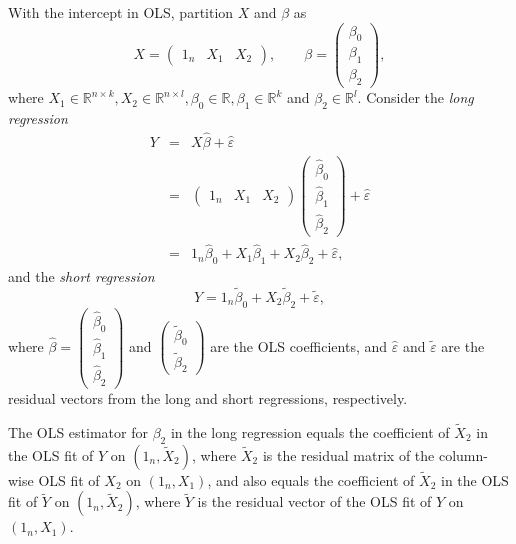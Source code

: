 With the intercept in OLS, partition $X$ and $\beta$ as 
\[
X=\left(\begin{array}{ccc}
1_n & X_{1} & X_{2}\end{array}\right),\qquad
\beta=\left(\begin{array}{c}
\beta_0 \\
\beta_{1}\\
\beta_{2}
\end{array}\right),
\]
where $X_{1}\in\mathbb{R}^{n\times k},X_{2}\in\mathbb{R}^{n\times l},  \beta_0 \in \mathbb{R},  \beta_{1}\in\mathbb{R}^{k}$ and $\beta_2 \in  \mathbb{R}^{l}$.  Consider the {\it long regression} 
\begin{eqnarray*}
Y &=& X\hat{\beta}+\hat{\varepsilon} \\
&=& \left(\begin{array}{ccc}
1_n & X_{1} & X_{2}\end{array}\right)\left(\begin{array}{c}
\hat{\beta}_0 \\
\hat{\beta}_{1}\\
\hat{\beta}_{2}
\end{array}\right)+\hat{\varepsilon} \\
&=& 1_n \hat{\beta}_0 +  X_{1}\hat{\beta}_{1}+X_{2}\hat{\beta}_{2}+\hat{\varepsilon},
\end{eqnarray*}
 and the {\it short regression} 
\[
Y= 1_n \tilde{\beta}_0  +   X_{2}\tilde{\beta}_{2}+\tilde{\varepsilon},
\]
where $\hat{\beta}=\left(\begin{array}{c}
\hat{\beta}_0 \\ 
\hat{\beta}_{1}\\
\hat{\beta}_{2}
\end{array}\right)$ and
$
\left(\begin{array}{c}
\tilde{\beta}_{0}\\
\tilde{\beta}_{2}
\end{array}\right)
$ are the OLS coefficients, and $\hat{\varepsilon}$
and $\tilde{\varepsilon}$ are the residual vectors from the long
and short regressions, respectively. 


\begin{theorem}
\label{thm:fwl2}The OLS estimator for $\beta_{2}$ in the long regression equals the coefficient of $\tilde{X}_{2}$ in the OLS fit of $Y$ on $(1_n,\tilde{X}_{2} )$, where $\tilde{X}_{2}$ is the residual matrix of the column-wise OLS fit of $X_2$ on $(1_n, X_1)$, and also equals the coefficient of $\tilde{X}_{2}$ in the OLS fit of $\tilde{Y}$ on $(1_n,\tilde{X}_{2} )$, where $\tilde{Y}$ is the residual vector of the OLS fit of $Y$ on $(1_n, X_1)$.
\end{theorem}


